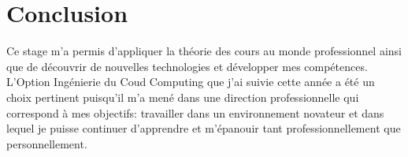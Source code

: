 \section{Conclusion}
Ce stage m'a permis d'appliquer la théorie des cours au monde professionnel ainsi que de découvrir de nouvelles technologies et développer mes compétences.
L'Option Ingénierie du Coud Computing que j'ai suivie cette année a été un choix pertinent puisqu'il m'a mené dans une direction professionnelle qui correspond à mes objectifs: travailler dans un environnement novateur et dans lequel je puisse continuer d'apprendre et m'épanouir tant professionnellement que personnellement.
